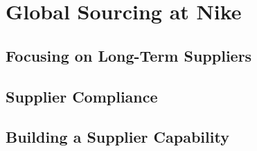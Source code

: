 \section{Global Sourcing at Nike}

\subsection{Focusing on Long-Term Suppliers}

\subsection{Supplier Compliance}

\subsection{Building a Supplier Capability}